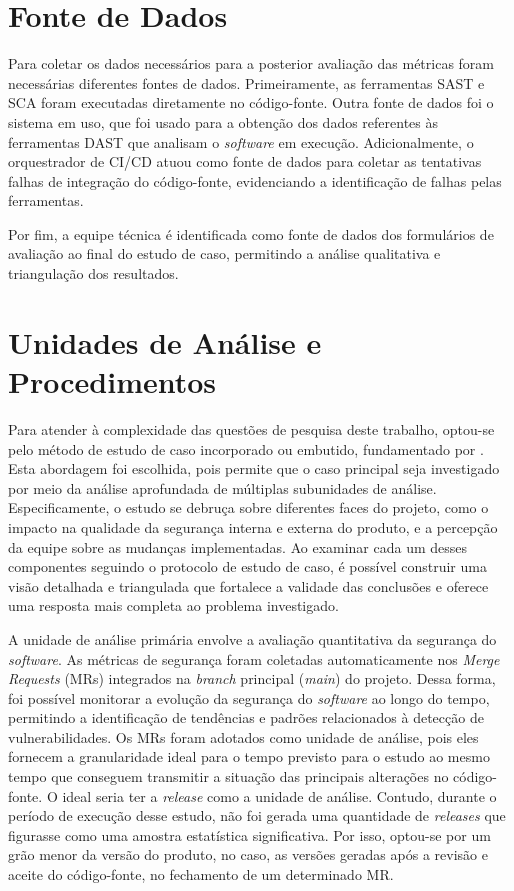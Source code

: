 \section{Fonte de Dados}

Para coletar os dados necessários para a posterior avaliação das métricas foram necessárias diferentes fontes de dados. Primeiramente, as ferramentas SAST e SCA foram executadas diretamente no código-fonte. 
Outra fonte de dados foi o sistema em uso, que foi usado para a obtenção dos dados referentes às ferramentas DAST que analisam o \textit{software} em execução.
Adicionalmente, o orquestrador de CI/CD atuou como fonte de dados para coletar as tentativas falhas de integração do código-fonte, evidenciando a identificação de falhas pelas ferramentas.

Por fim, a equipe técnica é identificada como fonte de dados dos formulários de avaliação ao final do estudo de caso, permitindo a análise qualitativa e triangulação dos resultados.

\section{Unidades de Análise e Procedimentos}

Para atender à complexidade das questões de pesquisa deste trabalho, optou-se pelo método de estudo de caso incorporado ou embutido, fundamentado por . 
Esta abordagem foi escolhida, pois permite que o caso principal seja investigado por meio da análise aprofundada de múltiplas subunidades de análise. Especificamente, o estudo se debruça sobre diferentes faces do projeto, como o impacto na qualidade da segurança interna e externa do produto, e a percepção da equipe sobre as mudanças implementadas. Ao examinar cada um desses componentes seguindo o protocolo de estudo de caso, é possível construir uma visão detalhada e triangulada que fortalece a validade das conclusões e oferece uma resposta mais completa ao problema investigado.

A unidade de análise primária envolve a avaliação quantitativa da segurança do \textit{software}. As métricas de segurança foram coletadas automaticamente nos \textit{Merge Requests} (MRs) integrados na \textit{branch} principal (\textit{main}) do projeto. Dessa forma, foi possível monitorar a evolução da segurança do \textit{software} ao longo do tempo, permitindo a identificação de tendências e padrões relacionados à detecção de vulnerabilidades. Os MRs foram adotados como unidade de análise, pois eles fornecem a granularidade ideal para o tempo previsto para o estudo ao mesmo tempo que conseguem transmitir a situação das principais alterações no código-fonte. 
O ideal seria ter a \textit{release} como a unidade de análise. Contudo, durante o período de execução desse estudo, não foi gerada uma quantidade de \textit{releases} que figurasse como uma amostra estatística significativa. Por isso, optou-se por um grão menor da versão do produto, no caso, as versões geradas após a revisão e aceite do código-fonte, no fechamento de um determinado MR.

